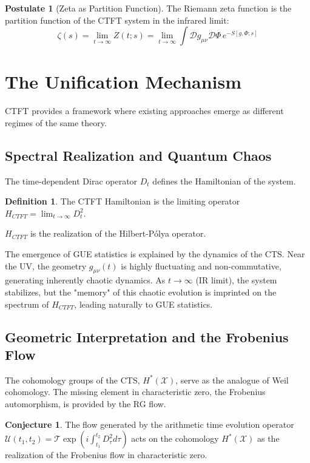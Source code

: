 \documentclass[11pt, a4paper]{article}
\theoremstyle{definition}
\newtheorem{definition}{Definition}[section]
\newtheorem{postulate}{Postulate}
\newtheorem{conjecture}{Conjecture}[section]
\newcommand{\CTS}{\mathcal{X}}
\begin{document}
\begin{postulate}[Zeta as Partition Function]
The Riemann zeta function is the partition function of the CTFT system in the infrared limit:
$$ \zeta(s) = \lim_{t\to\infty} Z(t; s) = \lim_{t\to\infty} \int \mathcal{D}g_{\mu\nu} \mathcal{D}\Phi \, e^{-S[g, \Phi; s]} $$
\end{postulate}

\section{The Unification Mechanism}
CTFT provides a framework where existing approaches emerge as different regimes of the same theory.

\subsection{Spectral Realization and Quantum Chaos}
The time-dependent Dirac operator $D_t$ defines the Hamiltonian of the system.
\begin{definition}
The CTFT Hamiltonian is the limiting operator $H_{CTFT} = \lim_{t\to\infty} D_t^2$.
\end{definition}
$H_{CTFT}$ is the realization of the Hilbert-Pólya operator.

The emergence of GUE statistics is explained by the dynamics of the CTS. Near the UV, the geometry $g_{\mu\nu}(t)$ is highly fluctuating and non-commutative, generating inherently chaotic dynamics. As $t\to\infty$ (IR limit), the system stabilizes, but the "memory" of this chaotic evolution is imprinted on the spectrum of $H_{CTFT}$, leading naturally to GUE statistics.

\subsection{Geometric Interpretation and the Frobenius Flow}
The cohomology groups of the CTS, $H^*(\CTS)$, serve as the analogue of Weil cohomology. The missing element in characteristic zero, the Frobenius automorphism, is provided by the RG flow.

\begin{conjecture}
The flow generated by the arithmetic time evolution operator $\mathcal{U}(t_1, t_2) = \mathcal{T} \exp\left(i \int_{t_1}^{t_2} D_\tau^2 d\tau\right)$ acts on the cohomology $H^*(\CTS)$ as the realization of the Frobenius flow in characteristic zero.
\end{conjecture}
\end{document}
